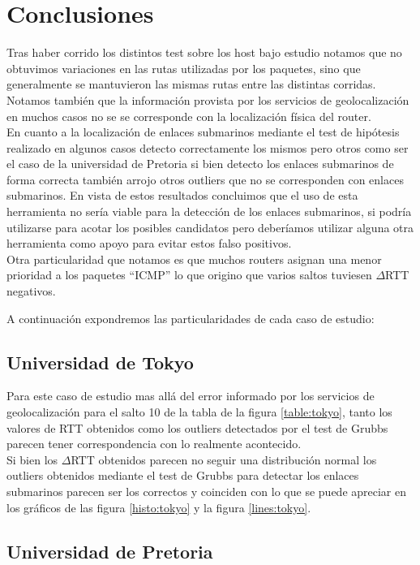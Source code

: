 \section{Conclusiones}

Tras haber corrido los distintos test sobre los host bajo estudio notamos que no obtuvimos variaciones en las rutas utilizadas por los paquetes, sino que generalmente se mantuvieron las mismas rutas entre las distintas corridas. 
Notamos también que la información provista por los servicios de geolocalización en muchos casos no se se corresponde con la localización física del router.\\
En cuanto a la localización de enlaces submarinos mediante el test de hipótesis realizado en algunos casos detecto correctamente los mismos pero otros como ser el caso de la universidad de Pretoria si bien detecto los enlaces submarinos de forma correcta también arrojo otros outliers que no se corresponden con enlaces submarinos. En vista de estos resultados concluimos que el uso de esta herramienta no sería viable para la detección de los enlaces submarinos, si podría utilizarse para acotar los posibles candidatos pero deberíamos utilizar alguna otra herramienta como apoyo para evitar estos falso positivos.\\
Otra particularidad que notamos es que muchos routers asignan una menor prioridad a los paquetes ``ICMP'' lo que origino que varios saltos tuviesen $\Delta$RTT negativos.

A continuación expondremos las particularidades de cada caso de estudio:

\subsection{Universidad de Tokyo}

Para este caso de estudio mas allá del error informado por los servicios de geolocalización para el salto 10 de la tabla de la figura \ref{table:tokyo}, tanto los valores de RTT obtenidos como los outliers detectados por el test de Grubbs parecen tener correspondencia con lo realmente acontecido.\\
Si bien los $\Delta$RTT obtenidos parecen no seguir una distribución normal los outliers obtenidos mediante el test de Grubbs para detectar los enlaces submarinos parecen ser los correctos y coinciden con lo que se puede apreciar en los gráficos de las figura \ref{histo:tokyo} y la figura \ref{lines:tokyo}.

\subsection{Universidad de Pretoria}

